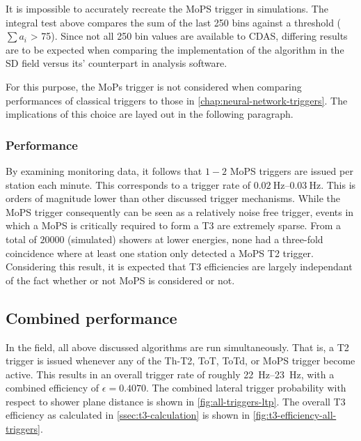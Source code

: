 It is impossible to accurately recreate the MoPS trigger in simulations. The integral test above compares the sum of the last 250 bins against a threshold 
($\sum a_i$ > 75). Since not all 250 bin values are available to CDAS, differing results are to be expected when comparing the implementation of the algorithm in 
the SD field versus its' counterpart in analysis software. 

For this purpose, the MoPs trigger is not considered when comparing performances of classical triggers to those in \autoref{chap:neural-network-triggers}. The 
implications of this choice are layed out in the following paragraph.

\subsubsection{Performance}
\label{ssec:mops-performance}

By examining monitoring data, it follows that $1-2$ MoPS triggers are issued per station each minute. This corresponds to a trigger rate of 
$\SIrange[range-phrase = \,\text{to}\,]{0.02}{0.03}{\hertz}$. This is orders of magnitude lower than other discussed trigger mechanisms. While the MoPS trigger 
consequently can be seen as a relatively noise free trigger, events in which a MoPS is critically required to form a T3 are extremely sparse. From a total of 
$20000$ (simulated) showers at lower energies, none had a three-fold coincidence where at least one station only detected a MoPS T2 trigger. Considering this 
result, it is expected that T3 efficiencies are largely independant of the fact whether or not MoPS is considered or not.

\subsection{Combined performance}
\label{ssec:combined-performance}

In the field, all above discussed algorithms are run simultaneously. That is, a T2 trigger is issued whenever any of the Th-T2, ToT, ToTd, or MoPS trigger become 
active. This results in an overall trigger rate of roughly \SIrange{22}{23}{\hertz}, with a combined efficiency of $\epsilon = 0.4070$. The combined lateral 
trigger probability with respect to shower plane distance is shown in \autoref{fig:all-triggers-ltp}. The overall T3 efficiency as calculated in 
\autoref{ssec:t3-calculation} is shown in \autoref{fig:t3-efficiency-all-triggers}.

